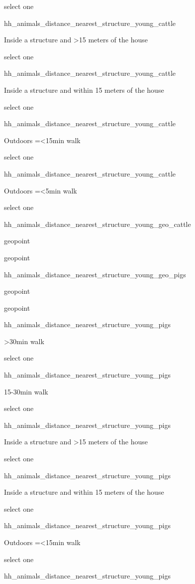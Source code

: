 \documentclass[]{article}
\begin{document}
select one

hh\_animals\_distance\_nearest\_structure\_young\_cattle

Inside a structure and \textgreater{}15 meters of the house

select one

hh\_animals\_distance\_nearest\_structure\_young\_cattle

Inside a structure and within 15 meters of the house

select one

hh\_animals\_distance\_nearest\_structure\_young\_cattle

Outdoors =\textless{}15min walk

select one

hh\_animals\_distance\_nearest\_structure\_young\_cattle

Outdoors =\textless{}5min walk

select one

hh\_animals\_distance\_nearest\_structure\_young\_geo\_cattle

geopoint

geopoint

hh\_animals\_distance\_nearest\_structure\_young\_geo\_pigs

geopoint

geopoint

hh\_animals\_distance\_nearest\_structure\_young\_pigs

\textgreater{}30min walk

select one

hh\_animals\_distance\_nearest\_structure\_young\_pigs

15-30min walk

select one

hh\_animals\_distance\_nearest\_structure\_young\_pigs

Inside a structure and \textgreater{}15 meters of the house

select one

hh\_animals\_distance\_nearest\_structure\_young\_pigs

Inside a structure and within 15 meters of the house

select one

hh\_animals\_distance\_nearest\_structure\_young\_pigs

Outdoors =\textless{}15min walk

select one

hh\_animals\_distance\_nearest\_structure\_young\_pigs
\end{document}

